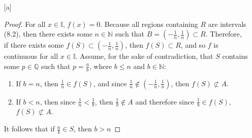 \documentclass[openany, amssymb, psamsfonts]{amsart}
\newcommand{\bbI}{\mathbb{I}}
\newcommand{\bbN}{\mathbb{N}}
\newcommand{\bbQ}{\mathbb{Q}}
\theoremstyle{definition}
\numberwithin{equation}{section}
\begin{document}
\begin{enumerate} [a]
\begin{proof}
For all $x\in \bbI$, $f(x) = 0$. Because all regions containing $R$ are intervals (8.2), then there exists some $n\in \bbN$ such that $B=(-\frac{1}{n},\frac{1}{n}) \subset R$. Therefore, if there exists some $f(S) \subset (-\frac{1}{n},\frac{1}{n})$, then $f(S)\subset R$, and so $f$ is continuous for all $x\in \bbI$. Assume, for the sake of contradiction, that $S$ contains some $p\in \bbQ$ such that $p = \frac{a}{b}$, where $b\leq n$ and $b\in \bbN$:
\begin{enumerate}
    \item If $b= n$, then $\frac{1}{n}\in f(S)$, and since $\frac{1}{n}\notin (-\frac{1}{n},\frac{1}{n})$, then $f(S) \not\subset A$.
    \item If $b<n$, then since $\frac{1}{n}<\frac{1}{b}$, then $\frac{1}{b}\notin A$ and therefore since $\frac{1}{b} \in f(S)$, $f(S)\not\subset A$. 
\end{enumerate}
It follows that if $\frac{a}{b}\in S$, then $b>n$


\end{proof}
\end{enumerate}
\end{document}
